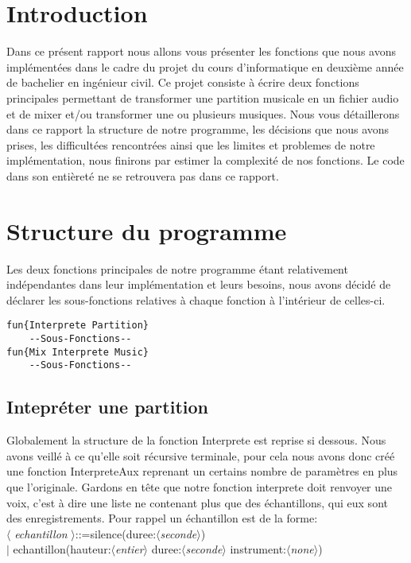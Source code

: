 \documentclass[a4paper,12pt]{report}
\begin{document}
\section{Introduction}
Dans ce présent rapport nous allons vous présenter les fonctions que nous avons implémentées dans le cadre du projet du cours d'informatique en deuxième année de bachelier en ingénieur civil. Ce projet consiste à écrire deux fonctions principales permettant de transformer une partition musicale en un fichier audio et de mixer et/ou transformer une ou plusieurs musiques. Nous vous détaillerons dans ce rapport la structure de notre programme, les décisions que nous avons prises, les difficultées rencontrées ainsi que les limites et problemes de notre implémentation, nous finirons par estimer la complexité de nos fonctions. Le code dans son entièreté ne se retrouvera pas dans ce rapport.

\section{Structure du programme}
Les deux fonctions principales de notre programme étant relativement indépendantes dans leur implémentation et leurs besoins, nous avons décidé de déclarer les sous-fonctions relatives à chaque fonction à l'intérieur de celles-ci.
\begin{lstlisting}[frame=single] 
fun{Interprete Partition}
	--Sous-Fonctions--
fun{Mix Interprete Music}
	--Sous-Fonctions--
\end{lstlisting}

\subsection{Intepréter une partition}
Globalement la structure de la fonction Interprete est reprise si dessous. Nous avons veillé à ce qu'elle soit récursive terminale, pour cela nous avons donc créé une fonction InterpreteAux reprenant un certains nombre de paramètres en plus que l'originale. 
Gardons en tête que notre fonction interprete doit renvoyer une voix, c'est à dire une liste ne contenant plus que des échantillons, qui eux sont des enregistrements. 
Pour rappel un échantillon est de la forme:\\
$\langle$ \textit{echantillon} $\rangle$::=silence(duree:$\langle$\textit{seconde}$\rangle$) \\
$\vert$ echantillon(hauteur:$\langle$\textit{entier}$\rangle$ duree:$\langle$\textit{seconde}$\rangle$ instrument:$\langle$\textit{none}$\rangle$)
\end{document}
